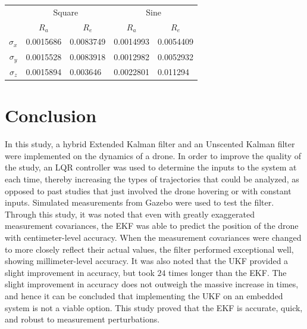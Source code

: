 \documentclass[letterpaper, paper,11pt]{AAS}	%
\begin{document}
\begin{table}[H]
\centering
\begin{tabular}{|r|ll|ll|}
\hline
\multirow{2}{*}{\ } & \multicolumn{2}{c|}{Square} & \multicolumn{2}{c|}{Sine} \\ \cline{2-5} 
 & \multicolumn{1}{c|}{$R_{a}$} & \multicolumn{1}{c|}{$R_{e}$} & \multicolumn{1}{c|}{$R_{a}$} & \multicolumn{1}{c|}{$R_{e}$} \\ \hline
$\sigma_x$ & \multicolumn{1}{l|}{0.0015686} & 0.0083749 & \multicolumn{1}{l|}{0.0014993} & 0.0054409 \\ \hline
$\sigma_y$ & \multicolumn{1}{l|}{0.0015528} & 0.0083918 & \multicolumn{1}{l|}{0.0012982} & 0.0052932 \\ \hline
$\sigma_z$ & \multicolumn{1}{l|}{0.0015894} & 0.003646 & \multicolumn{1}{l|}{0.0022801} & 0.011294 \\ \hline
\end{tabular}
\end{table}

\section{Conclusion}

In this study, a hybrid Extended Kalman filter and an Unscented Kalman filter were implemented on the dynamics of a drone. In order to improve the quality of the study, an LQR controller was used to determine the inputs to the system at each time, thereby increasing the types of trajectories that could be analyzed, as opposed to past studies that just involved the drone hovering or with constant inputs. Simulated measurements from Gazebo were used to test the filter. Through this study, it was noted that even with greatly exaggerated measurement covariances, the EKF was able to predict the position of the drone with centimeter-level accuracy. When the measurement covariances were changed to more closely reflect their actual values, the filter performed exceptional well, showing millimeter-level accuracy. It was also noted that the UKF provided a slight improvement in accuracy, but took $24$ times longer than the EKF. The slight improvement in accuracy does not outweigh the massive increase in times, and hence it can be concluded that implementing the UKF on an embedded system is not a viable option. This study proved that the EKF is accurate, quick, and robust to measurement perturbations.
\end{document}
